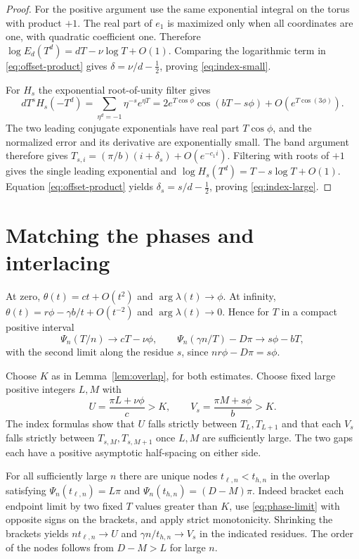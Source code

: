 \documentclass[11pt]{article}
\DeclareMathOperator{\Arg}{arg}
\begin{document}
\begin{proof}
For the positive argument use the same exponential integral
on the torus with product \(+1\).
The real part of \(e_1\) is maximized only when all coordinates
are one, with quadratic coefficient one.
Therefore \(\log E_d(T^d)=dT-\nu\log T+O(1)\).
Comparing the logarithmic term in \eqref{eq:offset-product}
gives \(\delta=\nu/d-\tfrac12\), proving
\eqref{eq:index-small}.

For \(H_s\) the exponential root-of-unity filter gives
\[
dT^s H_s(-T^d)
 =\sum_{\eta^d=-1}\eta^{-s}e^{\eta T}
 =2e^{T\cos\phi}\cos(bT-s\phi)
   +O(e^{T\cos(3\phi)}).
\]
The two leading conjugate exponentials have real part
\(T\cos\phi\), and the normalized error and its derivative
are exponentially small. The band argument therefore gives
\(T_{s,i}=(\pi/b)(i+\delta_s)+O(e^{-c_1i})\).
Filtering with roots of \(+1\) gives the single leading
exponential and \(\log H_s(T^d)=T-s\log T+O(1)\).
Equation \eqref{eq:offset-product} yields
\(\delta_s=s/d-\tfrac12\), proving \eqref{eq:index-large}.
\end{proof}

\section{Matching the phases and interlacing}

At zero, \(\theta(t)=ct+O(t^2)\) and
\(\Arg\lambda(t)\to\phi\).
At infinity, \(\theta(t)=r\phi-\gamma b/t+O(t^{-2})\)
and \(\Arg\lambda(t)\to0\).
Hence for \(T\) in a compact positive interval
\begin{equation}\label{eq:phase-limit}
\Psi_n(T/n)\longrightarrow cT-\nu\phi,\qquad
\Psi_n(\gamma n/T)-D\pi\longrightarrow s\phi-bT,
\end{equation}
with the second limit along the residue \(s\), since
\(nr\phi-D\pi=s\phi\).

Choose \(K\) as in Lemma~\ref{lem:overlap}, for both estimates.
Choose fixed large positive integers \(L,M\) with
\[
U=\frac{\pi L+\nu\phi}{c}>K,\qquad
V_s=\frac{\pi M+s\phi}{b}>K.
\]
The index formulas show that \(U\) falls strictly between
\(T_L,T_{L+1}\) and that each \(V_s\) falls strictly between
\(T_{s,M},T_{s,M+1}\) once \(L,M\) are sufficiently large.
The two gaps each have a positive asymptotic half-spacing
on either side.

For all sufficiently large \(n\) there are unique nodes
\(t_{\ell,n}<t_{h,n}\) in the overlap satisfying
\(\Psi_n(t_{\ell,n})=L\pi\) and
\(\Psi_n(t_{h,n})=(D-M)\pi\).
Indeed bracket each endpoint limit by two fixed \(T\)
values greater than \(K\), use \eqref{eq:phase-limit}
with opposite signs on the brackets, and apply strict
monotonicity. Shrinking the brackets yields
\(nt_{\ell,n}\to U\) and
\(\gamma n/t_{h,n}\to V_s\) in the indicated residues.
The order of the nodes follows from \(D-M>L\) for large \(n\).
\end{document}
